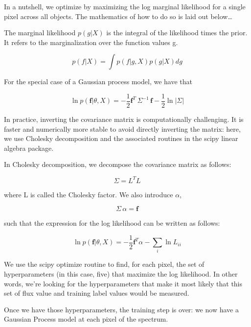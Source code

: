 \documentclass[12pt, preprint]{aastex}
\begin{document}
In a nutshell, we optimize by maximizing the log marginal likelihood for a 
single pixel across all objects. The mathematics of how to do so is laid out 
below\ldots

The marginal likelihood $p(g|X)$ is the integral of the likelihood times the
prior. It refers to the marginalization over the function values g.  

\begin{equation}
  p(f|X) = \int p(f|g,X) p(g|X)dg
  \label{}
\end{equation}

For the special case of a Gaussian process model, we have that 

\begin{equation}
  \ln{p}(\textbf{f} | \theta, X) = 
  -\frac{1}{2} \textbf{f}^{T}\,\Sigma^{-1}\,\textbf{f}-\frac{1}{2}\ln{|\Sigma|}
\end{equation}

In practice, inverting the covariance matrix is computationally challenging.
It is faster and numerically more stable to avoid directly inverting the 
matrix: here, we use Cholesky decomposition and the associated routines
in the scipy linear algebra package. 

In Cholesky decomposition, we decompose the covariance matrix as follows:

\begin{equation}
  \Sigma = L^T L  
  \label{}
\end{equation}

where L is called the Cholesky factor. We also introduce $\alpha$, 

\begin{equation}
  \Sigma \, \alpha = \textbf{f}
  \label{}
\end{equation}

such that the expression for the log likelihood can be written as follows:

\begin{equation}
  \ln{p}(\textbf{f} | \theta, X) = 
  -\frac{1}{2} \textbf{f}^T \alpha - \sum_i \ln{L_{ii}}
\end{equation}

We use the scipy optimize routine to find, for each pixel, the set of
hyperparameters (in this case, five) that maximize the log likelihood. 
In other words, we're looking for the hyperparameters that make it most likely
that this set of flux value and training label values would be measured.

Once we have those hyperparameters, the training step is over: we now have
a Gaussian Process model at each pixel of the spectrum. 
\end{document}
